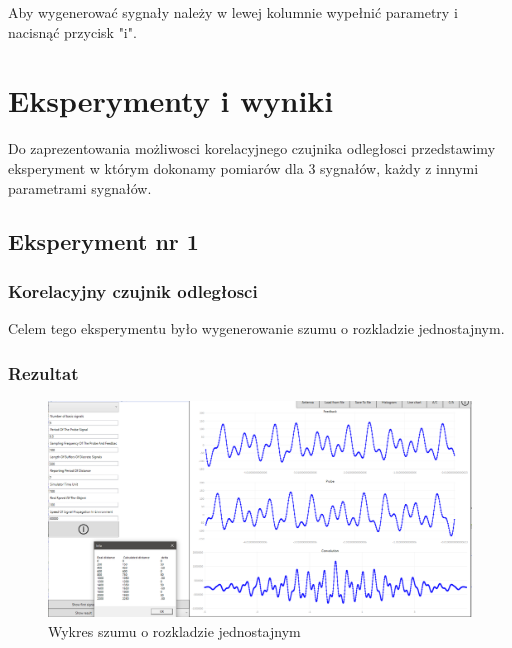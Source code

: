 \documentclass[12pt]{article}
\begin{document}
Aby wygenerować sygnały należy w lewej kolumnie wypełnić parametry i nacisnąć przycisk "i". 
\section{Eksperymenty i wyniki}



Do zaprezentowania możliwosci korelacyjnego czujnika odległosci przedstawimy eksperyment w którym dokonamy pomiarów dla 3 sygnałów, każdy z innymi parametrami sygnałów.

\subsection{Eksperyment nr 1 }
\subsubsection{Korelacyjny czujnik odległosci}
Celem tego eksperymentu było wygenerowanie szumu o rozkladzie jednostajnym.


\subsubsection{Rezultat}

\begin{figure}[H]
 \centering
 \includegraphics[width=14cm]{images/a1.PNG}
 \vspace{-0.3cm}
 \caption{Wykres szumu o rozkladzie jednostajnym}
 \label{gui}
\end{figure}
\end{document}
